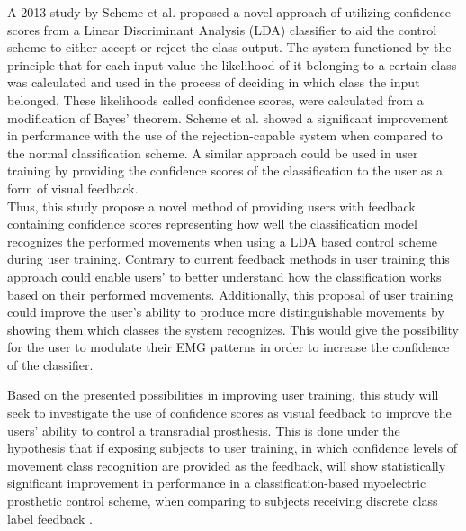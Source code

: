 A 2013 study by Scheme et al. \cite{Scheme2013} proposed a novel approach of utilizing confidence scores from a Linear Discriminant Analysis (LDA) classifier to aid the control scheme to either accept or reject the class output. The system functioned by the principle that for each input value the likelihood of it belonging to a certain class was calculated and used in the process of deciding in which class the input belonged. These likelihoods called confidence scores, were calculated from a modification of Bayes' theorem. Scheme et al. \cite{Scheme2013} showed a significant improvement in performance with the use of the rejection-capable system when compared to the normal classification scheme. A similar approach could be used in user training by providing the confidence scores of the classification to the user as a form of visual feedback. \\
Thus, this study propose a novel method of providing users with feedback containing confidence scores representing how well the classification model recognizes the performed movements when using a LDA based control scheme during user training. Contrary to current feedback methods in user training this approach could enable users' to better understand how the classification works based on their performed movements. Additionally, this proposal of user training could improve the user's ability to produce more distinguishable movements by showing them which classes the system recognizes. This would give the possibility for the user to modulate their EMG patterns in order to increase the confidence of the classifier.  

Based on the presented possibilities in improving user training, this study will seek to investigate the use of confidence scores as visual feedback to improve the users' ability to control a transradial prosthesis. %
This is done under the hypothesis that if exposing subjects to user training, in which confidence levels of movement class recognition are provided as the feedback, will show statistically significant improvement in performance in a classification-based myoelectric prosthetic control scheme, when comparing to subjects receiving discrete class label feedback \cite{Fang2017}.

